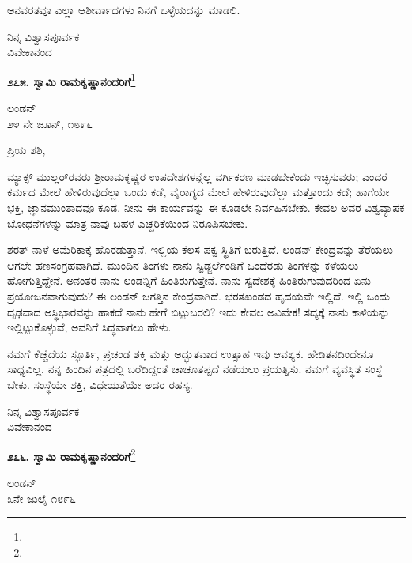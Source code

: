ಅನವರತವೂ ಎಲ್ಲಾ ಆಶೀರ್ವಾದಗಳು ನಿನಗೆ ಒಳ್ಳೆಯದನ್ನು ಮಾಡಲಿ.

{\flushright
ನಿನ್ನ ವಿಶ್ವಾಸಪೂರ್ವಕ\\ವಿವೇಕಾನಂದ\par}

\begin{center}
\textbf{೨೭೫. ಸ್ವಾಮಿ ರಾಮಕೃಷ್ಣಾನಂದರಿಗೆ}\footnote{}
\end{center}

\begin{flushright}
ಲಂಡನ್\\೨೪ ನೇ ಜೂನ್, ೧೮೯೬
\end{flushright}

\noindent
ಪ್ರಿಯ ಶಶಿ,

ಮ್ಯಾಕ್ಸ್ ಮುಲ್ಲರ್‌ರವರು ಶ‍್ರೀರಾಮಕೃಷ್ಣರ ಉಪದೇಶಗಳನ್ನೆಲ್ಲ ವರ್ಗಿಕರಣ ಮಾಡಬೇಕೆಂದು ಇಚ್ಛಿಸುವರು; ಎಂದರೆ ಕರ್ಮದ ಮೇಲೆ ಹೇಳಿರುವುದೆಲ್ಲಾ ಒಂದು ಕಡೆ, ವೈರಾಗ್ಯದ ಮೇಲೆ ಹೇಳಿರುವುದೆಲ್ಲಾ ಮತ್ತೊಂದು ಕಡೆ; ಹಾಗೆಯೇ ಭಕ್ತಿ, ಜ್ಞಾನ\break ಮುಂತಾದವೂ ಕೂಡ. ನೀನು ಈ ಕಾರ್ಯವನ್ನು ಈ ಕೂಡಲೇ ನಿರ್ವಹಿಸಬೇಕು. ಕೇವಲ ಅವರ ವಿಶ್ವವ್ಯಾಪಕ ಬೋಧನೆಗಳನ್ನು ಮಾತ್ರ ನಾವು ಬಹಳ ಎಚ್ಚರಿಕೆಯಿಂದ ನಿರೂಪಿಸಬೇಕು.

ಶರತ್ ನಾಳೆ ಅಮೆರಿಕಾಕ್ಕೆ ಹೊರಡುತ್ತಾನೆ. ಇಲ್ಲಿಯ ಕೆಲಸ ಪಕ್ವ ಸ್ಥಿತಿಗೆ ಬರುತ್ತಿದೆ. ಲಂಡನ್ ಕೇಂದ್ರವನ್ನು ತೆರೆಯಲು ಆಗಲೇ ಹಣಸಂಗ್ರಹವಾಗಿದೆ. ಮುಂದಿನ ತಿಂಗಳು ನಾನು ಸ್ವಿಡ್ಜರ್ಲೆಂಡಿಗೆ ಒಂದೆರಡು ತಿಂಗಳನ್ನು ಕಳೆಯಲು ಹೋಗುತ್ತಿದ್ದೇನೆ. ಅನಂತರ ನಾನು ಲಂಡನ್ನಿಗೆ ಹಿಂತಿರುಗುತ್ತೇನೆ. ನಾನು ಸ್ವದೇಶಕ್ಕೆ ಹಿಂತಿರುಗುವುದರಿಂದ ಏನು ಪ್ರಯೋಜನವಾಗುವುದು? ಈ ಲಂಡನ್ ಜಗತ್ತಿನ ಕೇಂದ್ರವಾಗಿದೆ. ಭರತಖಂಡದ ಹೃದಯವೇ ಇಲ್ಲಿದೆ. ಇಲ್ಲಿ ಒಂದು ದೃಢವಾದ ಅಸ್ಥಿಭಾರವನ್ನು ಹಾಕದೆ ನಾನು ಹೇಗೆ ಬಿಟ್ಟುಬರಲಿ? ಇದು ಕೇವಲ ಅವಿವೇಕ! ಸದ್ಯಕ್ಕೆ ನಾನು ಕಾಳಿಯನ್ನು ಇಲ್ಲಿಟ್ಟುಕೊಳ್ಳುವೆ, ಅವನಿಗೆ ಸಿದ್ಧವಾಗಲು ಹೇಳು.

ನಮಗೆ ಕೆಚ್ಚೆದೆಯ ಸ್ಫೂರ್ತಿ, ಪ್ರಚಂಡ ಶಕ್ತಿ ಮತ್ತು ಅದ್ಭುತವಾದ ಉತ್ಸಾಹ ಇವು ಆವಶ್ಯಕ. ಹೇಡಿತನದಿಂದೇನೂ ಸಾಧ್ಯವಿಲ್ಲ. ನನ್ನ ಹಿಂದಿನ ಪತ್ರದಲ್ಲಿ ಬರೆದಿದ್ದಂತೆ ಚಾಚೂತಪ್ಪದೆ ನಡೆಯಲು ಪ್ರಯತ್ನಿಸು. ನಮಗೆ ವ್ಯವಸ್ಥಿತ ಸಂಸ್ಥೆ ಬೇಕು. ಸಂಸ್ಥೆಯೇ ಶಕ್ತಿ, ವಿಧೇಯತೆಯೇ ಅದರ ರಹಸ್ಯ.
\vspace{-0.4cm}

{\flushright
ನಿನ್ನ ವಿಶ್ವಾಸಪೂರ್ವಕ\\ವಿವೇಕಾನಂದ\par}
\vspace{-0.2cm}

\begin{center}
\textbf{೨೭೬. ಸ್ವಾಮಿ ರಾಮಕೃಷ್ಣಾನಂದರಿಗೆ}\footnote{}
\end{center}
\vspace{-0.4cm}

\begin{flushright}
ಲಂಡನ್\\೩ನೇ ಜುಲೈ ೧೮೯೬
\end{flushright}


